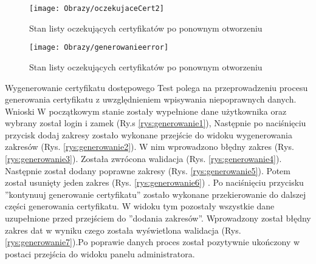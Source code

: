 \begin{enumerate*}
\begin{figure}
	\centering
		\begin{minipage}{0.4\textwidth}
			\texttt{[image: Obrazy/oczekujaceCert2]}
			\caption{Stan listy oczekujących certyfikatów po ponownym otworzeniu}
			\label{rys:generowanieCert3}
		\end{minipage}
	\hspace{0.01\textwidth}
	\begin{minipage}{0.4\textwidth}
		\texttt{[image: Obrazy/generowanieerror]}
		\caption{Stan listy oczekujących certyfikatów po ponownym otworzeniu}
		\label{rys:generowanieCert4}
	\end{minipage}
	\end{figure}
	
	\newpage
	\item  Wygenerowanie certyfikatu dostępowego
	Test polega na przeprowadzeniu procesu generowania certyfikatu z uwzględnieniem wpisywania niepoprawnych danych.
	Wnioski W początkowym stanie zostały wypełnione dane użytkownika oraz wybrany został login i zamek (Ry.s \ref{rys:generowanie1}), Następnie po naciśnięciu przycisk dodaj zakresy zostało wykonane przejście do widoku  wygenerowania zakresów (Rys. \ref{rys:generowanie2}). W nim wprowadzono  błędny zakres (Rys. \ref{rys:generowanie3}). Została zwrócona walidacja (Rys. \ref{rys:generowanie4}). Następnie został dodany poprawne zakresy (Rys. \ref{rys:generowanie5}). Potem został usunięty jeden zakres (Rys. \ref{rys:generowanie6})   . Po naciśnięciu przycisku ''kontynuuj generowanie certyfikatu'' zostało wykonane przekierowanie  do dalszej części generowania certyfikatu. W widoku tym pozostały wszystkie dane uzupełnione przed przejściem do ''dodania zakresów''. Wprowadzony został błędny zakres dat w wyniku czego została wyświetlona walidacja (Rys. \ref{rys:generowanie7}).Po poprawie danych proces został pozytywnie ukończony w postaci przejścia do widoku panelu administratora.
	

\end{enumerate*}
